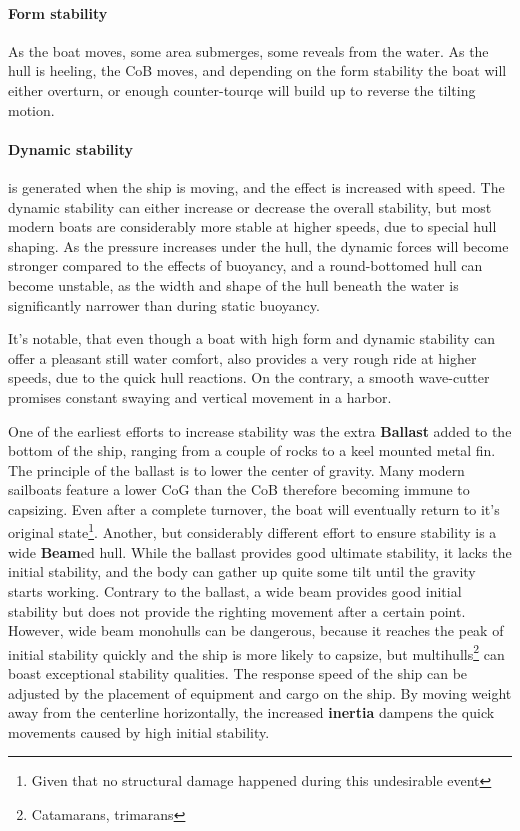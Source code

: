 \paragraph{Form stability} As the boat moves, some area submerges, some reveals from the water. As the hull is heeling, the CoB moves, and depending on the form stability the boat will either overturn, or enough counter-tourqe will build up to reverse the tilting motion.

\paragraph{Dynamic stability} is generated when the ship is moving, and the effect is increased with speed. The dynamic stability can either increase or decrease the overall stability, but most modern boats are considerably more stable at higher speeds, due to special hull shaping. As the pressure increases under the hull, the dynamic forces will become stronger compared to the effects of buoyancy, and a round-bottomed hull can become unstable, as the width and shape of the hull beneath the water is significantly narrower than during static buoyancy.

It's notable, that even though a boat with high form and dynamic stability can offer a pleasant still water comfort, also provides a very rough ride at higher speeds, due to the quick hull reactions. On the contrary, a smooth wave-cutter promises constant swaying and vertical movement in a harbor.

One of the earliest efforts to increase stability was the extra \textbf{Ballast} added to the bottom of the ship, ranging from a couple of rocks to a keel mounted metal fin. The principle of the ballast is to lower the center of gravity. Many modern sailboats feature a lower CoG than the CoB therefore becoming immune to capsizing. Even after a complete turnover, the boat will eventually return to it's original state\footnote{Given that no structural damage happened during this undesirable event}.
Another, but considerably different effort to ensure stability is a wide \textbf{Beam}ed hull. While the ballast provides good ultimate stability, it lacks the initial stability, and the body can gather up quite some tilt until the gravity starts working. Contrary to the ballast, a wide beam provides good initial stability but does not provide the righting movement after a certain point. However,  wide beam monohulls can be dangerous, because it reaches the peak of initial stability quickly and the ship is more likely to capsize, but multihulls\footnote{Catamarans, trimarans} can boast exceptional stability qualities.
The response speed of the ship can be adjusted by the placement of equipment and cargo on the ship. By moving weight away from the centerline horizontally, the increased \textbf{inertia} dampens the quick movements caused by high initial stability.


